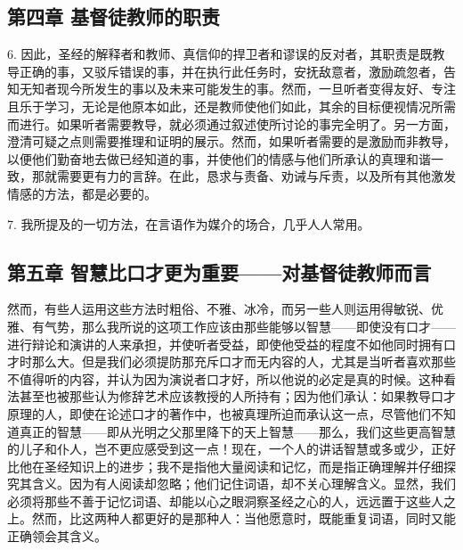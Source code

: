 
\subsection{第四章 基督徒教师的职责}

6. 因此，圣经的解释者和教师、真信仰的捍卫者和谬误的反对者，其职责是既教导正确的事，又驳斥错误的事，并在执行此任务时，安抚敌意者，激励疏忽者，告知无知者现今所发生的事以及未来可能发生的事。然而，一旦听者变得友好、专注且乐于学习，无论是他原本如此，还是教师使他们如此，其余的目标便视情况所需而进行。如果听者需要教导，就必须通过叙述使所讨论的事完全明了。另一方面，澄清可疑之点则需要推理和证明的展示。然而，如果听者需要的是激励而非教导，以便他们勤奋地去做已经知道的事，并使他们的情感与他们所承认的真理和谐一致，那就需要更有力的言辞。在此，恳求与责备、劝诫与斥责，以及所有其他激发情感的方法，都是必要的。\par

7. 我所提及的一切方法，在言语作为媒介的场合，几乎人人常用。\par


\subsection{第五章 智慧比口才更为重要——对基督徒教师而言}

然而，有些人运用这些方法时粗俗、不雅、冰冷，而另一些人则运用得敏锐、优雅、有气势，那么我所说的这项工作应该由那些能够以智慧——即使没有口才——进行辩论和演讲的人来承担，并使听者受益，即使他受益的程度不如他同时拥有口才时那么大。但是我们必须提防那充斥口才而无内容的人，尤其是当听者喜欢那些不值得听的内容，并认为因为演说者口才好，所以他说的必定是真的时候。这种看法甚至也被那些认为修辞艺术应该教授的人所持有；因为他们承认：如果教导口才原理的人，即使在论述口才的著作中，也被真理所迫而承认这一点，尽管他们不知道真正的智慧——即从光明之父那里降下的天上智慧——那么，我们这些更高智慧的儿子和仆人，岂不更应感受到这一点！现在，一个人的讲话智慧或多或少，正好比他在圣经知识上的进步；我不是指他大量阅读和记忆，而是指正确理解并仔细探究其含义。因为有人阅读却忽略；他们记住词语，却不关心理解含义。显然，我们必须将那些不善于记忆词语、却能以心之眼洞察圣经之心的人，远远置于这些人之上。然而，比这两种人都更好的是那种人：当他愿意时，既能重复词语，同时又能正确领会其含义。\par

